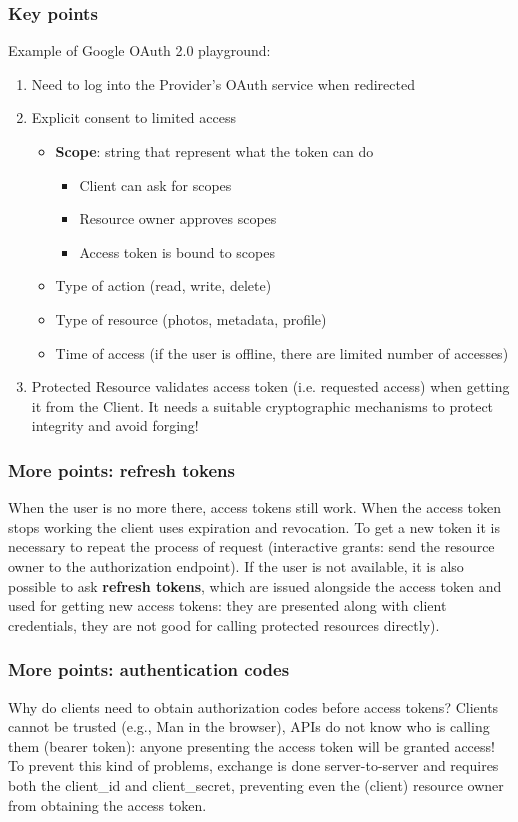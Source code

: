 \documentclass[a4paper, 10pt, titlepage]{article}
\begin{document}
\subsubsection{Key points}
Example of Google OAuth 2.0 playground:
\begin{enumerate}
\item Need to log into the Provider’s OAuth service when redirected
\item Explicit consent to limited access
	\begin{itemize}
	\item \textbf{Scope}: string that represent what the token can do
		\begin{itemize}
		\item Client can ask for scopes
		\item Resource owner approves scopes
		\item Access token is bound to scopes
		\end{itemize}
	\item Type of action (read, write, delete)
	\item Type of resource (photos, metadata, profile)
	\item Time of access (if the user is offline, there are limited number of accesses)	
	\end{itemize}
\item Protected Resource validates access token (i.e. requested
access) when getting it from the Client. It needs a suitable cryptographic mechanisms to protect integrity and avoid forging!
\end{enumerate}

\subsubsection{More points: refresh tokens} %
When the user is no more there, access tokens still work. When the access token stops working the client uses expiration and revocation. To get a new token it is necessary to repeat the process of request (interactive grants: send the resource owner to the authorization endpoint). If the user is not available, it is also possible to ask \textbf{refresh tokens}, which are issued alongside the access token and used for getting new access tokens: they are presented along with client credentials, they are not good for calling protected resources directly).

\subsubsection{More points: authentication codes}
Why do clients need to obtain authorization codes before access tokens? Clients cannot be trusted (e.g., Man in the browser), APIs do not know who is calling them (bearer token): anyone presenting the access token will be granted access! To prevent this kind of problems, exchange is done server-to-server and requires both the client\_id and client\_secret, preventing even the (client) resource owner from obtaining the access token.
\end{document}
